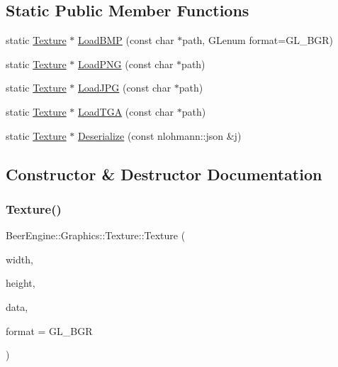 \subsection*{Static Public Member Functions}
\begin{DoxyCompactItemize}
\item 
static \mbox{\hyperlink{class_beer_engine_1_1_graphics_1_1_texture}{Texture}} $\ast$ \mbox{\hyperlink{class_beer_engine_1_1_graphics_1_1_texture_aad31fe0bd31ac46cf56c11e5a152a07f}{Load\+B\+MP}} (const char $\ast$path, G\+Lenum format=G\+L\+\_\+\+B\+GR)
\item 
static \mbox{\hyperlink{class_beer_engine_1_1_graphics_1_1_texture}{Texture}} $\ast$ \mbox{\hyperlink{class_beer_engine_1_1_graphics_1_1_texture_ae49b1e363625c007c5553e1ace04cace}{Load\+P\+NG}} (const char $\ast$path)
\item 
static \mbox{\hyperlink{class_beer_engine_1_1_graphics_1_1_texture}{Texture}} $\ast$ \mbox{\hyperlink{class_beer_engine_1_1_graphics_1_1_texture_ad59a1155532f41e9a46666def60218df}{Load\+J\+PG}} (const char $\ast$path)
\item 
static \mbox{\hyperlink{class_beer_engine_1_1_graphics_1_1_texture}{Texture}} $\ast$ \mbox{\hyperlink{class_beer_engine_1_1_graphics_1_1_texture_a57210a6e3dfc7cedc814c76753ba387e}{Load\+T\+GA}} (const char $\ast$path)
\item 
static \mbox{\hyperlink{class_beer_engine_1_1_graphics_1_1_texture}{Texture}} $\ast$ \mbox{\hyperlink{class_beer_engine_1_1_graphics_1_1_texture_aa7a835edb0417a09057481ba44de53df}{Deserialize}} (const nlohmann\+::json \&j)
\end{DoxyCompactItemize}


\subsection{Constructor \& Destructor Documentation}
\mbox{\label{class_beer_engine_1_1_graphics_1_1_texture_a1cb1dc8dea72805bec4fcbb150417c7f}} 
\subsubsection{\texorpdfstring{Texture()}{Texture()}}
{\footnotesize\ttfamily Beer\+Engine\+::\+Graphics\+::\+Texture\+::\+Texture (\begin{DoxyParamCaption}\item[{unsigned int}]{width,  }\item[{unsigned int}]{height,  }\item[{unsigned char $\ast$}]{data,  }\item[{G\+Lenum}]{format = {\ttfamily GL\+\_\+BGR} }\end{DoxyParamCaption})}

